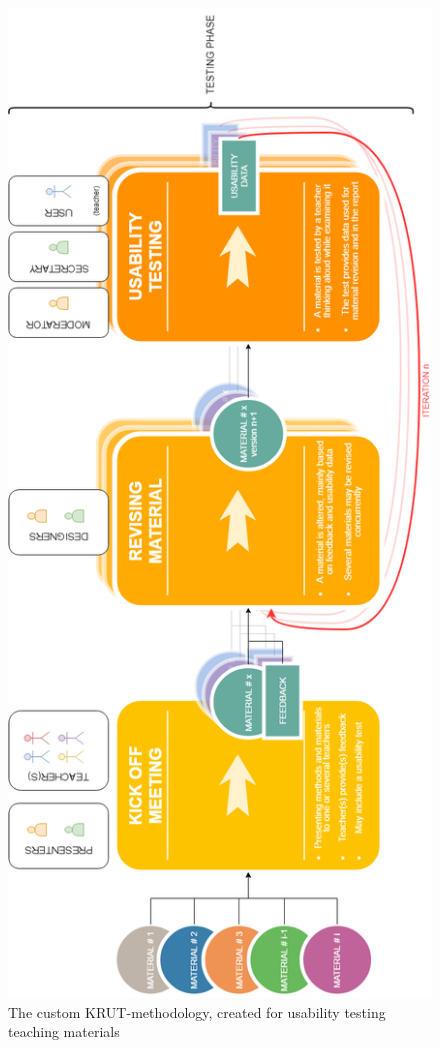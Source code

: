 \begin{figure}
\centering
\includegraphics[scale=0.6,angle=-90]{figure/workflow.png}
\vspace*{2cm}
\caption{The custom KRUT-methodology, created for usability testing teaching materials}
\label{workflow}
\end{figure}


